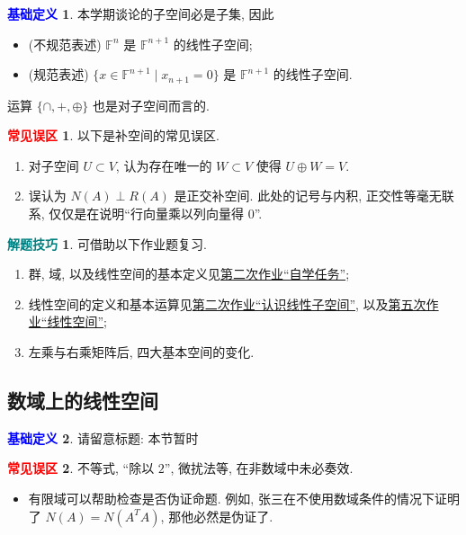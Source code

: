 \documentclass[11pt]{ctexart}
\theoremstyle{definition}
\numberwithin{equation}{section}
\theoremstyle{definition}
\newtheorem*{definition}{\textcolor{blue}{基础定义}}
\newtheorem*{trick}{\textcolor{teal}{解题技巧}}
\newtheorem*{warning}{\textcolor{red}{常见误区}}
\theoremstyle{remark}
\begin{document}
\begin{definition}
    本学期谈论的子空间必是子集, 因此
    \begin{itemize}
        \item (不规范表述) $\mathbb F^n$ 是 $\mathbb F^{n+1}$ 的线性子空间; 
        \item (规范表述) $\{x\in \mathbb F^{n+1}\mid x_{n+1}=0\}$ 是 $\mathbb F^{n+1}$ 的线性子空间. 
    \end{itemize}
    运算 $\{\cap, +, \oplus\}$ 也是对子空间而言的.
\end{definition}

\begin{warning}
    以下是补空间的常见误区. 
    \begin{enumerate}
        \item 对子空间 $U\subset V$, 认为存在唯一的 $W\subset V$ 使得 $U\oplus W=V$. 
        \item 误认为 $N(A)\perp R(A)$ 是正交补空间. 此处的记号与内积, 正交性等毫无联系, 仅仅是在说明``行向量乘以列向量得 $0$''. 
    \end{enumerate}
\end{warning}

\begin{trick}
    可借助以下作业题复习. 
    \begin{enumerate}
        \item 群, 域, 以及线性空间的基本定义见\href{https://oc.sjtu.edu.cn/courses/72790/files/9519554?wrap=1}{第二次作业``自学任务''};
        \item 线性空间的定义和基本运算见\href{https://oc.sjtu.edu.cn/courses/72790/files/9519888?wrap=1}{第二次作业``认识线性子空间''}, 以及\href{https://oc.sjtu.edu.cn/courses/72790/files/9768544?wrap=1}{第五次作业``线性空间''};
        \item 左乘与右乘矩阵后, 四大基本空间的变化.  
    \end{enumerate}
\end{trick}

\subsection{数域上的线性空间}

\begin{definition}
    请留意标题: 本节暂时
\end{definition}

\begin{warning}
    不等式, ``除以 $2$'', 微扰法等, 在非数域中未必奏效. 
    \begin{itemize}
        \item 有限域可以帮助检查是否伪证命题. 例如, 张三在不使用数域条件的情况下证明了 $N(A)=N(A^TA)$, 那他必然是伪证了. 
    \end{itemize}
\end{warning}
\end{document}
